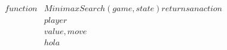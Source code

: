 \documentclass[preview]{standalone}
\begin{document}
\begin{align*}
function &MinimaxSearch(game, state) returns an action \\&player \\& value,move \\&hola
\end{align*}
\end{document}
